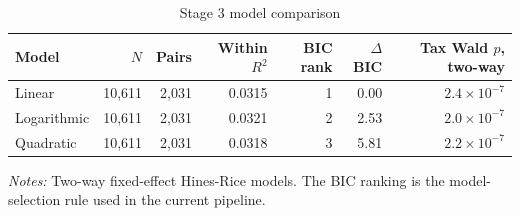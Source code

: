 \begin{table}[H]
\centering
\small
\setlength{\tabcolsep}{4pt}
\caption[Stage 3 model comparison]{Stage 3 model comparison}
\label{tab:stage3_model_comparison}
\begin{tabular}{@{}lrrrrrr@{}}
\toprule
Model & $N$ & Pairs & Within $R^2$ & BIC rank & $\Delta$BIC & Tax Wald $p$, two-way \\
\midrule
Linear & 10,611 & 2,031 & 0.0315 & 1 & 0.00 & $2.4 \times 10^{-7}$ \\
Logarithmic & 10,611 & 2,031 & 0.0321 & 2 & 2.53 & $2.0 \times 10^{-7}$ \\
Quadratic & 10,611 & 2,031 & 0.0318 & 3 & 5.81 & $2.2 \times 10^{-7}$ \\
\bottomrule
\end{tabular}

\vspace{0.35em}
\noindent\begin{minipage}{\textwidth}
\footnotesize\raggedright\textit{Notes:} Two-way fixed-effect Hines-Rice models. The BIC ranking is the model-selection rule used in the current pipeline.
\end{minipage}
\end{table}
